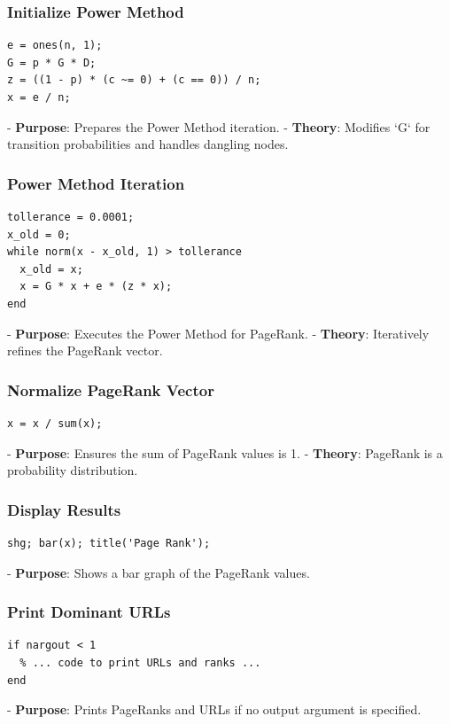 \documentclass[unicode,11pt,a4paper,oneside,numbers=endperiod,openany]{scrartcl}
\begin{document}
\subsubsection{Initialize Power Method}
\begin{lstlisting}
e = ones(n, 1);
G = p * G * D;
z = ((1 - p) * (c ~= 0) + (c == 0)) / n;
x = e / n;
\end{lstlisting}
- \textbf{Purpose}: Prepares the Power Method iteration.
- \textbf{Theory}: Modifies `G` for transition probabilities and handles dangling nodes.

\subsubsection{Power Method Iteration}
\begin{lstlisting}
tollerance = 0.0001;
x_old = 0;
while norm(x - x_old, 1) > tollerance
  x_old = x;
  x = G * x + e * (z * x);
end
\end{lstlisting}
- \textbf{Purpose}: Executes the Power Method for PageRank.
- \textbf{Theory}: Iteratively refines the PageRank vector.

\subsubsection{Normalize PageRank Vector}
\begin{lstlisting}
x = x / sum(x);
\end{lstlisting}
- \textbf{Purpose}: Ensures the sum of PageRank values is 1.
- \textbf{Theory}: PageRank is a probability distribution.

\subsubsection{Display Results}
\begin{lstlisting}
shg; bar(x); title('Page Rank');
\end{lstlisting}
- \textbf{Purpose}: Shows a bar graph of the PageRank values.

\subsubsection{Print Dominant URLs}
\begin{lstlisting}
if nargout < 1
  % ... code to print URLs and ranks ...
end
\end{lstlisting}
- \textbf{Purpose}: Prints PageRanks and URLs if no output argument is specified.
\end{document}
